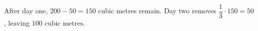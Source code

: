 After day one, $200-50=150$ cubic metres remain. Day two removes $\dfrac{1}{3}\cdot150=50$, leaving $\boxed{100\text{ cubic metres}}$.
